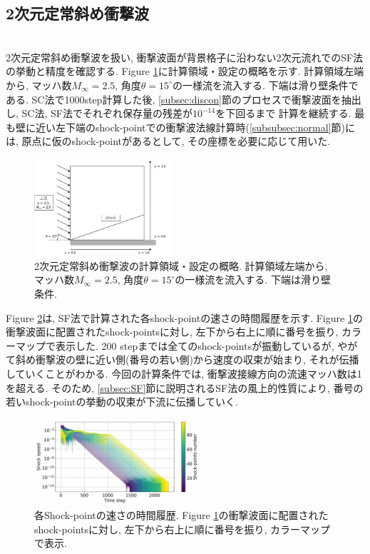 \documentclass[a4j]{jarticle}
\begin{document}
\subsection{2次元定常斜め衝撃波}\label{subsec:2Ddiag}
\mbox{}\\[-3.0ex]

2次元定常斜め衝撃波を扱い, 衝撃波面が背景格子に沿わない2次元流れでのSF法の挙動と精度を確認する.
Figure \ref{fig:2Ddiagsituation}に計算領域・設定の概略を示す.
計算領域左端から, マッハ数$M_\infty=2.5$, 角度$\theta=15^\circ$の一様流を流入する.
下端は滑り壁条件である. SC法で1000step計算した後, \ref{subsec:discon}節のプロセスで衝撃波面を抽出し, SC法, SF法でそれぞれ保存量の残差が$10^{-14}$を下回るまで
計算を継続する. 最も壁に近い左下端のshock-pointでの衝撃波法線計算時(\ref{subsubsec:normal}節)には,
原点に仮のshock-pointがあるとして, その座標を必要に応じて用いた.
\begin{figure}[H]
    \begin{center}
        \includegraphics[width=0.45\textwidth]{2Ddiagsituation.pdf}
    \end{center}
    \caption{2次元定常斜め衝撃波の計算領域・設定の概略.
    計算領域左端から, マッハ数$M_\infty=2.5$, 角度$\theta=15^\circ$の一様流を流入する.
    下端は滑り壁条件.}
    \label{fig:2Ddiagsituation}
\end{figure}
Figure \ref{fig:2Ddiagconv}は, SF法で計算された各shock-pointの速さの時間履歴を示す.
Figure \ref{fig:2Ddiagsituation}の衝撃波面に配置されたshock-pointsに対し, 
左下から右上に順に番号を振り, カラーマップで表示した.
200 stepまでは全てのshock-pointsが振動しているが, やがて斜め衝撃波の壁に近い側(番号の若い側)から速度の収束が始まり,
それが伝播していくことがわかる.
今回の計算条件では, 衝撃波接線方向の流速マッハ数は1を超える.
そのため, \ref{subsec:SF}節に説明されるSF法の風上的性質により, 
番号の若いshock-pointの挙動の収束が下流に伝播していく.
\begin{figure}[h]
    \centering
    \hspace*{-8mm} %
    \includegraphics[width=0.57\textwidth]{2Ddiagconv.pdf}
    \caption{各Shock-pointの速さの時間履歴. Figure \ref{fig:2Ddiagsituation}の衝撃波面に配置されたshock-pointsに対し, 
左下から右上に順に番号を振り, カラーマップで表示.}
    \label{fig:2Ddiagconv}
\end{figure}
\end{document}
